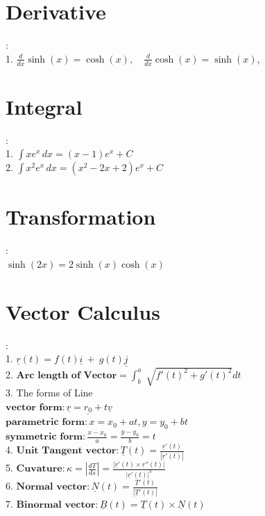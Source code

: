\documentclass[twocolumn]{article}
\newcommand{\sectionspace}{\vspace*{1em}}
\begin{document}
\sectionspace


\section{Derivative}
:\\
1. $\frac{d}{dx} \sinh(x) = \cosh(x), \quad
\frac{d}{dx} \cosh(x) = \sinh(x)$,

\section{Integral}
:\\
1. $\int xe^x \, dx = (x - 1)e^x + C$\\
2. $\int x^2 e^x \, dx = (x^2 - 2x + 2)e^x + C$\\


\sectionspace

\section{Transformation}
:\\
$ \sinh(2x)=2\sinh(x)\cosh(x)$\\

\sectionspace

\section{Vector Calculus}
:\\
1. $\underline{r}(t) = f(t) \underline{i} \ + \ g(t) \underline{j}$\\
2. $\textbf{Arc length of Vector} = \int_{b}^{a} \sqrt[]{f'(t)^2 + g'(t)^2} dt $\\
3. The forms of Line\\
$\textbf{vector form}: \underline{r} = \underline{r_{0}} + t\underline{v}$\\
$\textbf{parametric form}: x = x_{0} + at, y = y_{0} + bt $\\
$\textbf{symmetric form}: \frac{x-x_{0}}{a} = \frac{y-y_{0}}{b} = t$\\
4. $\textbf{Unit Tangent vector}: \underline{T}(t) = \frac{\underline{r}'(t)}{|\underline{r}'(t)|}$\\
5. $\textbf{Cuvature}: \kappa = |\frac{dT}{ds}| = \frac{\lvert \underline{r}'(t) \times \underline{r}''(t) \rvert}{\lvert \underline{r}'(t) \rvert^3}$\\
6. $\textbf{Normal vector}: \underline{N}(t) = \frac{\underline{T}'(t)}{|\underline{T}'(t)|}$\\
7. $\textbf{Binormal vector}: \underline{B}(t) = \underline{T}(t) \times \underline{N}(t)$
\end{document}
